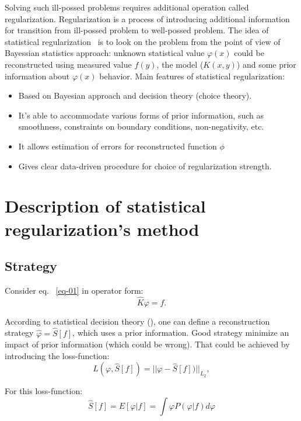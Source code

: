 \documentclass{webofc}
\begin{document}
Solving such ill-possed problems requires additional operation called regularization. Regularization is a process of introducing additional information for transition from ill-possed problem to well-possed problem. The idea of statistical regularization~\cite{Turchin, Turovceva} is to look on the problem from the point of view of Bayessian statistics approach: unknown statistical value $\varphi(x)$ could be reconstructed using  measured value $f(y)$, the model ($K(x,y)$) and some prior information about $\varphi(x)$ behavior. Main features of statistical regularization:
\begin{itemize}
    \item Based on Bayesian approach and decision theory (choice theory).
    \item It's able to accommodate various forms of prior information, such as
      smoothness, constraints on boundary conditions, non-negativity, etc.
    \item It allows estimation of errors for reconstructed function $\phi$
    \item Gives clear data-driven procedure for choice of regularization
      strength.
\end{itemize}

\section{Description of statistical regularization's method}

\subsection{Strategy}\label{sec:theory:strat}

Consider eq. ~\ref{eq-01} in operator form:
\begin{equation}
	\label{eq-02}
    \hat{K}\varphi = f.
\end{equation}

According to statistical decision theory (\cite{james2006statistical}), one can define a reconstruction strategy  $\hat{\varphi} = \hat{S}[f]$, which uses a prior information. Good strategy minimize an impact of prior information (which could be wrong). That could be achieved by introducing the loss-function:
\begin{equation*}
	L(\varphi,\hat{S}[f]) = ||\varphi-\hat{S}[f])||_{L_2},
\end{equation*}

For this loss-function:
\begin{equation}
	\label{eq:opt}
	\hat{S}[f] = E[\varphi|f] = \int \varphi P(\varphi|f)d\varphi
\end{equation}
\end{document}
